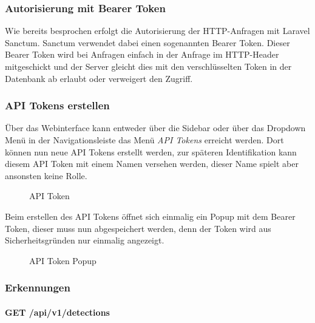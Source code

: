 \subsubsection{Autorisierung mit Bearer Token}
Wie bereits besprochen erfolgt die Autorisierung der HTTP-Anfragen mit Laravel
Sanctum. Sanctum verwendet dabei einen sogenannten Bearer Token. Dieser Bearer
Token wird bei Anfragen einfach in der Anfrage im HTTP-Header mitgeschickt und
der Server gleicht dies mit den verschlüsselten Token in der Datenbank ab
erlaubt oder verweigert den Zugriff.

\subsubsection{API Tokens erstellen}
Über das Webinterface kann entweder über die Sidebar oder über das Dropdown Menü
in der Navigationsleiste das Menü \textit{API Tokens} erreicht werden. Dort
können nun neue API Tokens erstellt werden, zur späteren Identifikation kann
diesem API Token mit einem Namen versehen werden, dieser Name spielt aber
ansonsten keine Rolle. 

\begin{figure}[H]
  \centering
  \caption{API Token}
\end{figure}

Beim erstellen des API Tokens öffnet sich einmalig ein Popup mit dem Bearer
Token, dieser muss nun abgespeichert werden, denn der Token wird aus
Sicherheitsgründen nur einmalig angezeigt.

\begin{figure}[H]
  \centering
  \caption{API Token Popup}
\end{figure}

\subsubsection{Erkennungen}
\paragraph{GET /api/v1/detections}\mbox{}\\

